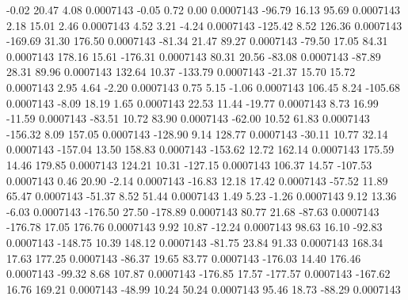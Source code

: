        -0.02       20.47        4.08     0.0007143
       -0.05        0.72        0.00     0.0007143
      -96.79       16.13       95.69     0.0007143
        2.18       15.01        2.46     0.0007143
        4.52        3.21       -4.24     0.0007143
     -125.42        8.52      126.36     0.0007143
     -169.69       31.30      176.50     0.0007143
      -81.34       21.47       89.27     0.0007143
      -79.50       17.05       84.31     0.0007143
      178.16       15.61     -176.31     0.0007143
       80.31       20.56      -83.08     0.0007143
      -87.89       28.31       89.96     0.0007143
      132.64       10.37     -133.79     0.0007143
      -21.37       15.70       15.72     0.0007143
        2.95        4.64       -2.20     0.0007143
        0.75        5.15       -1.06     0.0007143
      106.45        8.24     -105.68     0.0007143
       -8.09       18.19        1.65     0.0007143
       22.53       11.44      -19.77     0.0007143
        8.73       16.99      -11.59     0.0007143
      -83.51       10.72       83.90     0.0007143
      -62.00       10.52       61.83     0.0007143
     -156.32        8.09      157.05     0.0007143
     -128.90        9.14      128.77     0.0007143
      -30.11       10.77       32.14     0.0007143
     -157.04       13.50      158.83     0.0007143
     -153.62       12.72      162.14     0.0007143
      175.59       14.46      179.85     0.0007143
      124.21       10.31     -127.15     0.0007143
      106.37       14.57     -107.53     0.0007143
        0.46       20.90       -2.14     0.0007143
      -16.83       12.18       17.42     0.0007143
      -57.52       11.89       65.47     0.0007143
      -51.37        8.52       51.44     0.0007143
        1.49        5.23       -1.26     0.0007143
        9.12       13.36       -6.03     0.0007143
     -176.50       27.50     -178.89     0.0007143
       80.77       21.68      -87.63     0.0007143
     -176.78       17.05      176.76     0.0007143
        9.92       10.87      -12.24     0.0007143
       98.63       16.10      -92.83     0.0007143
     -148.75       10.39      148.12     0.0007143
      -81.75       23.84       91.33     0.0007143
      168.34       17.63      177.25     0.0007143
      -86.37       19.65       83.77     0.0007143
     -176.03       14.40      176.46     0.0007143
      -99.32        8.68      107.87     0.0007143
     -176.85       17.57     -177.57     0.0007143
     -167.62       16.76      169.21     0.0007143
      -48.99       10.24       50.24     0.0007143
       95.46       18.73      -88.29     0.0007143
